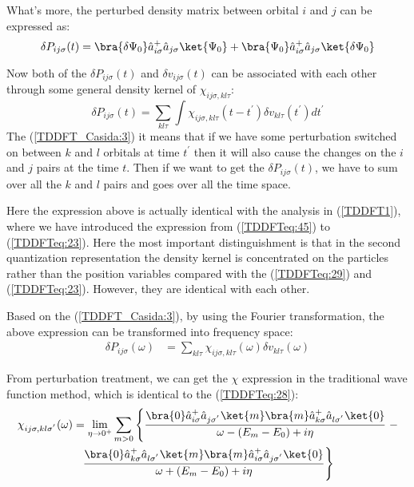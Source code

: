 What's more, the perturbed density matrix between orbital $i$ and $j$
can be expressed as:
\begin{equation}
 \label{TDDFT_Casida:2}
\delta P_{ij\sigma} (t) =
\bra{\delta
\Psi_{0}}\hat{a}^{+}_{i\sigma}\hat{a}_{j\sigma}\ket{
\Psi_{0}} + \bra{
\Psi_{0}}\hat{a}^{+}_{i\sigma}\hat{a}_{j\sigma}\ket{\delta
\Psi_{0}}
\end{equation} 

Now both of the $\delta P_{ij\sigma} (t)$ and $\delta v_{ij\sigma}
(t)$ can be associated with each other through some general
density kernel of $\chi_{ij\sigma, kl\tau}$:
\begin{equation}
  \label{TDDFT_Casida:3}
\delta P_{ij\sigma} (t) = \sum_{kl\tau}\int \chi_{ij\sigma, kl\tau}(t
- t^{'}) \delta v_{kl\tau} (t^{'}) dt^{'}
\end{equation} 
The (\ref{TDDFT_Casida:3}) it means that if we have some perturbation
switched on between $k$ and $l$ orbitals at time $t^{'}$ then it will
also cause the changes on the $i$ and $j$ pairs at the time $t$. Then
if we want to get the $\delta P_{ij\sigma} (t)$, we have to sum over
all the $k$ and $l$ pairs and goes over all the time space.

Here the expression above is actually identical with the analysis in
(\ref{TDDFT1}), where we have introduced the expression
from (\ref{TDDFTeq:45}) to (\ref{TDDFTeq:23}). Here the most
important distinguishment is that in the second quantization
representation the density kernel is concentrated on the particles
rather than the position variables compared with the
(\ref{TDDFTeq:29}) and (\ref{TDDFTeq:23}). However,
they are identical with each other.

Based on the (\ref{TDDFT_Casida:3}), by using the Fourier
transformation, the above expression can be transformed
into frequency space:
\begin{align}
   \label{TDDFT_Casida:8}
\delta P_{ij\sigma} (\omega) &= \sum_{kl\tau} \chi_{ij\sigma,
kl\tau}(\omega) \delta v_{kl\tau} (\omega ) 
\end{align}

From perturbation treatment, we can get the $\chi$
expression in the traditional wave function method, which is
identical to the (\ref{TDDFTeq:28}):
\begin{multline}\label{TDDFT_Casida:4}
\chi_{ij\sigma, kl\sigma^{'}}(\omega) =
\lim_{\eta \rightarrow 0^{+}}\sum_{m > 0}\left\{
\frac{\bra{0}\hat{a}^{+}_{i\sigma}\hat{a}_{j\sigma^{'}}\ket{m}
      \bra{m}\hat{a}^{+}_{k\sigma}\hat{a}_{l\sigma^{'}}\ket{0}}
      {\omega - (E_{m} - E_{0})+ i\eta}
      \right. - \\
\left. 
\frac{\bra{0}\hat{a}^{+}_{k\sigma}\hat{a}_{l\sigma^{'}}\ket{m}
      \bra{m}\hat{a}^{+}_{i\sigma}\hat{a}_{j\sigma^{'}}\ket{0}}
      {\omega + (E_{m} - E_{0})+ i\eta}
\right\}
\end{multline}

